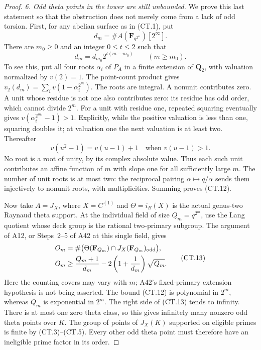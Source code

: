 \begin{proof}
\emph{6. Odd theta points in the tower are still unbounded.}
We prove this last statement so that the obstruction does not
merely come from a lack of odd torsion. First, for any abelian
surface as in (CT.1), put
\[
 d_m=\#A(\mathbf F_{q^{2^m}})[2^\infty].
\]
There are $m_0\ge0$ and an integer $0\le t\le2$ such that
\[
                     d_m=d_{m_0}2^{t(m-m_0)}
                         \qquad(m\ge m_0).
 \tag{CT.12}
\]
To see this, put all four roots $\alpha_i$ of $P_A$ in a finite
extension of $\mathbf Q_2$, with valuation normalized by $v(2)=1$.
The point-count product gives
$v_2(d_m)=\sum_i v(1-\alpha_i^{2^m})$.
The roots are integral. A nonunit contributes zero. A unit whose
residue is not one also contributes zero: its residue has odd
order, which cannot divide $2^m$.
For a unit with residue one, repeated squaring eventually gives
$v(\alpha_i^{2^{m_0}}-1)>1$. Explicitly, while the positive
valuation is less than one, squaring doubles it; at valuation
one the next valuation is at least two. Thereafter
\[
  v(u^2-1)=v(u-1)+1\quad\text{when }v(u-1)>1.
\]
No root is a root of unity, by its complex absolute value.
Thus each such unit contributes an affine function of $m$ with
slope one for all sufficiently large $m$.
The number of unit roots is at most two: the reciprocal pairing
$\alpha\mapsto q/\alpha$ sends them injectively to nonunit
roots, with multiplicities. Summing proves (CT.12).

Now take $A=J_X$, where $X=C^{(1)}$ and
$\Theta=i_B(X)$ is the actual genus-two Raynaud theta support.
At the individual field of size $Q_m=q^{2^m}$, use the Lang
quotient whose deck group is the rational two-primary subgroup.
The argument of A12, or Steps~2--5 of A42 at this single field,
gives
\[
 \begin{aligned}
 O_m&=\#\bigl(\Theta(\mathbf F_{Q_m})
                  \cap J_X(\mathbf F_{Q_m})_{\rm odd}\bigr),\\
 O_m&\ge\frac{Q_m+1}{d_m}
                      -2\left(1+\frac1{d_m}\right)\sqrt{Q_m}.
 \end{aligned}
 \tag{CT.13}
\]
Here the counting covers may vary with $m$; A42's fixed-primary
extension hypothesis is not being asserted. The bound (CT.12)
is polynomial in $2^m$, whereas $Q_m$ is exponential in $2^m$.
The right side of (CT.13) tends to infinity. There is at most
one zero theta class, so this gives infinitely many nonzero
odd theta points over $K$.
The group of points of $J_X(K)$ supported on eligible primes
is finite by (CT.3)--(CT.5). Every other odd theta point must
therefore have an ineligible prime factor in its order.
\end{proof}

